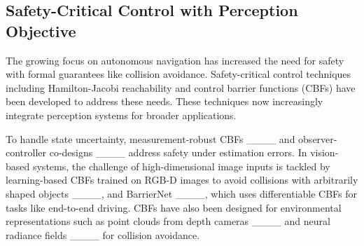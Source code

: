 


\subsection{Safety-Critical Control with Perception Objective}


The growing focus on autonomous navigation has increased the need for safety with formal guarantees like collision avoidance. Safety-critical control techniques including Hamilton-Jacobi reachability and control barrier functions (CBFs) have been developed to address these needs. These techniques now increasingly integrate perception systems for broader applications.

To handle state uncertainty, measurement-robust CBFs ____ and observer-controller co-designs ____ address safety under estimation errors. In vision-based systems, the challenge of high-dimensional image inputs is tackled by learning-based CBFs trained on RGB-D images to avoid collisions with arbitrarily shaped objects ____, and BarrierNet ____, which uses differentiable CBFs for tasks like end-to-end driving. CBFs have also been designed for environmental representations such as point clouds from depth cameras ____ and neural radiance fields ____ for collision avoidance.

